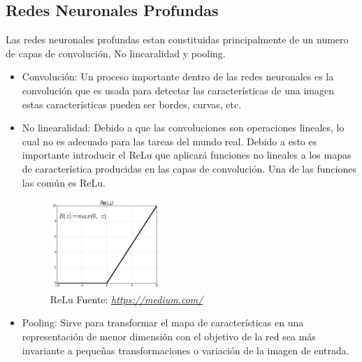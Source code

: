 \subsection*{Redes Neuronales Profundas}
Las redes neuronales profundas estan constituidas principalmente de un numero de capas de convolución, No linearalidad y pooling.
\begin{itemize}
	\item Convolución:
	Un proceso importante dentro de las redes neuronales es la convolución que es usada para detectar las características de una imagen estas características pueden ser bordes, curvas, etc.
	\item No linearalidad:
	Debido a que las convoluciones son operaciones lineales, lo cual no es adecuado para las tareas del mundo real. Debido a esto es importante introducir el ReLu que aplicará funciones no lineales a los mapas de característica producidas en las capas de convolución.
	Una de las funciones las común es ReLu.
	\begin{figure}[H]
		\centering
		\includegraphics[width=0.4\textwidth]{Figures/relu.png}
		\caption{ReLu  Fuente:
			\href{https://medium.com/@kanchansarkar/relu-not-a-differentiable-function-why-used-in-gradient-based-optimization-7fef3a4cecec}{\textit{https://medium.com/}}
			 }
		\label{ReLu}
	\end{figure}

	
	\item Pooling:
	Sirve para transformar el mapa de características en una representación de menor dimensión con el objetivo de la red sea más invariante a pequeñas transformaciones o variación de la imagen de entrada.
\end{itemize}






\afterpage{\blankpage}